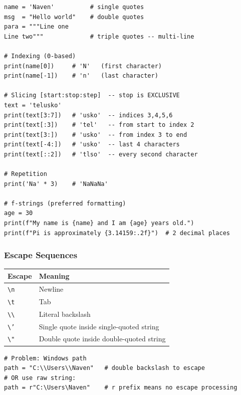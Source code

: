 \documentclass[12pt,a4paper]{article}
\begin{document}
\begin{lstlisting}
name = 'Naven'          # single quotes
msg  = "Hello world"    # double quotes
para = """Line one
Line two"""             # triple quotes -- multi-line

# Indexing (0-based)
print(name[0])     # 'N'   (first character)
print(name[-1])    # 'n'   (last character)

# Slicing [start:stop:step]  -- stop is EXCLUSIVE
text = 'telusko'
print(text[3:7])   # 'usko'  -- indices 3,4,5,6
print(text[:3])    # 'tel'   -- from start to index 2
print(text[3:])    # 'usko'  -- from index 3 to end
print(text[-4:])   # 'usko'  -- last 4 characters
print(text[::2])   # 'tlso'  -- every second character

# Repetition
print('Na' * 3)    # 'NaNaNa'

# f-strings (preferred formatting)
age = 30
print(f"My name is {name} and I am {age} years old.")
print(f"Pi is approximately {3.14159:.2f}")  # 2 decimal places
\end{lstlisting}

\subsubsection{Escape Sequences}

\begin{center}
\begin{tabular}{ll}
\toprule
\textbf{Escape} & \textbf{Meaning} \\
\midrule
\texttt{\textbackslash n} & Newline \\
\texttt{\textbackslash t} & Tab \\
\texttt{\textbackslash\textbackslash} & Literal backslash \\
\texttt{\textbackslash '} & Single quote inside single-quoted string \\
\texttt{\textbackslash "} & Double quote inside double-quoted string \\
\bottomrule
\end{tabular}
\end{center}

\begin{lstlisting}
# Problem: Windows path
path = "C:\\Users\\Naven"   # double backslash to escape
# OR use raw string:
path = r"C:\Users\Naven"    # r prefix means no escape processing
\end{lstlisting}
\end{document}
